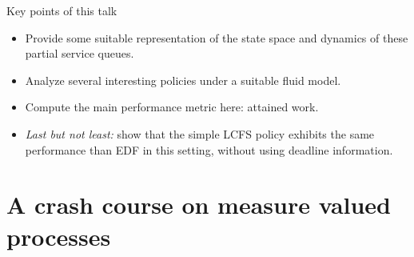 \documentclass[aspectratio=169]{beamer}
\newenvironment*{myitem}[1][1.5em]{\begin{itemize}\setlength{\itemsep}{#1}}{\end{itemize}}
\begin{document}
\begin{frame}{Key points of this talk}
	
	\begin{myitem}
		\item Provide some suitable representation of the state space and dynamics of these partial service queues.
		
		\item Analyze several interesting policies under a suitable fluid model.
		
		\item Compute the main performance metric here: \alert{attained work}.
		
		\item \emph{Last but not least:} show that the simple LCFS policy \alert{exhibits the same performance} than EDF in this setting, without using deadline information. 
	\end{myitem}
\end{frame}

\section{A crash course on measure valued processes}
\end{document}
